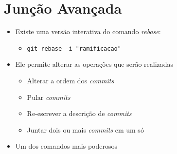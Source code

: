 \documentclass{beamer}
\newenvironment{slide}{\begin{frame}{\insertsection}}{\end{frame}}
\begin{document}
\section{Junção Avançada}
\begin{slide}
    \begin{itemize}
        \item Existe uma versão interativa do comando \emph{rebase}\pause:
        \begin{itemize}
            \pause
            \item \texttt{git rebase -i "ramificacao"}
        \end{itemize}
        \pause
        \item Ele permite alterar as operações que serão realizadas
        \begin{itemize}
            \pause
            \item Alterar a ordem dos \emph{commits}
            \pause
            \item Pular \emph{commits}
            \pause
            \item Re-escrever a descrição de \emph{commits}
            \pause
            \item Juntar dois ou mais \emph{commits} em um só
        \end{itemize}
        \pause
        \item Um dos comandos mais poderosos
    \end{itemize}
\end{slide}
\end{document}
